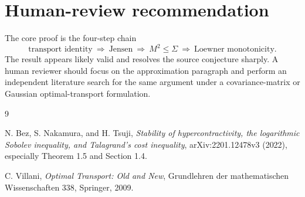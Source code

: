 \documentclass[11pt]{article}
\begin{document}
\section{Human-review recommendation}

The core proof is the four-step chain
\[
 \text{transport identity}\ \Longrightarrow\ \text{Jensen}\
 \Longrightarrow\ M^2\leq\Sigma\ \Longrightarrow\ \text{Loewner monotonicity}.
\]
The result appears likely valid and resolves the source conjecture sharply.
A human reviewer should focus on the approximation paragraph and perform an
independent literature search for the same argument under a covariance-matrix
or Gaussian optimal-transport formulation.

\begin{thebibliography}{9}

N. Bez, S. Nakamura, and H. Tsuji,
\emph{Stability of hypercontractivity, the logarithmic Sobolev inequality,
and Talagrand's cost inequality}, arXiv:2201.12478v3 (2022), especially
Theorem 1.5 and Section 1.4.

C. Villani, \emph{Optimal Transport: Old and New}, Grundlehren der
mathematischen Wissenschaften 338, Springer, 2009.

\end{thebibliography}
\end{document}

